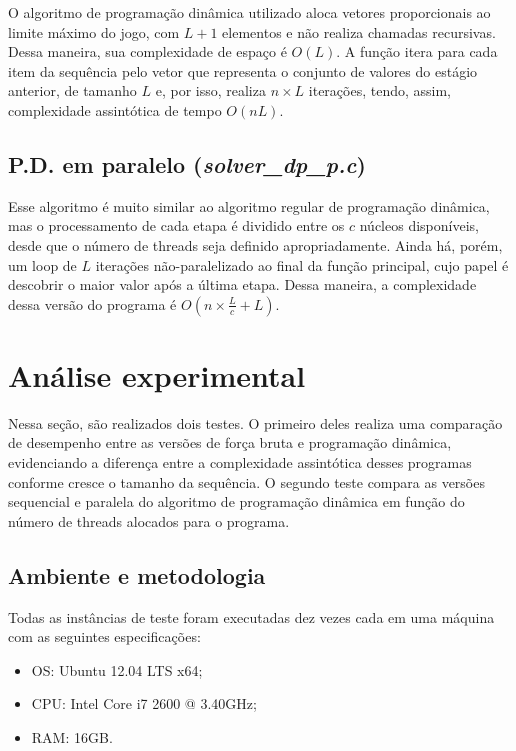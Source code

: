 \documentclass[10pt,a4paper]{article}
\numberwithin{equation}{section}
\begin{document}
O algoritmo de programação dinâmica utilizado aloca vetores proporcionais ao limite máximo do jogo, com $L + 1$ elementos e não realiza chamadas recursivas. Dessa maneira, sua complexidade de espaço é $O(L)$. A função itera para cada item da sequência pelo vetor que representa o conjunto de valores do estágio anterior, de tamanho $L$ e, por isso, realiza $n \times L$ iterações, tendo, assim, complexidade assintótica de tempo $O(nL)$.

\subsection{P.D. em paralelo (\emph{solver\_dp\_p.c})}

Esse algoritmo é muito similar ao algoritmo regular de programação dinâmica, mas o processamento de cada etapa é dividido entre os $c$ núcleos disponíveis, desde que o número de threads seja definido apropriadamente. Ainda há, porém, um loop de $L$ iterações não-paralelizado ao final da função principal, cujo papel é descobrir o maior valor após a última etapa. Dessa maneira, a complexidade dessa versão do programa é $O(n \times \frac{L}{c} + L)$.

\section{Análise experimental}

Nessa seção, são realizados dois testes. O primeiro deles realiza uma comparação de desempenho entre as versões de força bruta e programação dinâmica, evidenciando a diferença entre a complexidade assintótica desses programas conforme cresce o tamanho da sequência. O segundo teste compara as versões sequencial e paralela do algoritmo de programação dinâmica em função do número de threads alocados para o programa.

\subsection{Ambiente e metodologia}

Todas as instâncias de teste foram executadas dez vezes cada em uma máquina com as seguintes especificações:

\begin{itemize}
    \item OS: Ubuntu 12.04 LTS x64;
    \item CPU: Intel Core i7 2600 @ 3.40GHz;
    \item RAM: 16GB.
\end{itemize}
\end{document}
